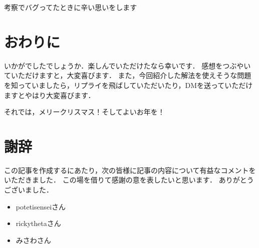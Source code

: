 \documentclass[13pt]{jarticle}
\begin{document}
考察でバグってたときに辛い思いをします

\section{おわりに}

いかがでしたでしょうか．楽しんでいただけたなら幸いです．
感想をつぶやいていただけますと，大変喜びます．
また，今回紹介した解法を使えそうな問題を知っていましたら，リプライを飛ばしていただいたり，DMを送っていただけますとやはり大変喜びます．

それでは，メリークリスマス！そしてよいお年を！



\section{謝辞}
この記事を作成するにあたり，次の皆様に記事の内容について有益なコメントをいただきました．
この場を借りて感謝の意を表したいと思います．
ありがとうございました．
\begin{itemize}
\item potetisenseiさん
\item rickythetaさん
\item みさわさん
\end{itemize}
\end{document}
